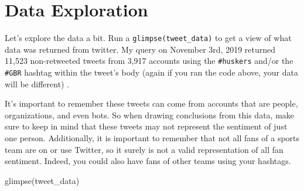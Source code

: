 \documentclass[
  letterpaper,
  DIV=11,
  numbers=noendperiod]{scrreprt}
\newenvironment{Shaded}{\begin{snugshade}}{\end{snugshade}}
\newcommand{\FunctionTok}[1]{\textcolor[rgb]{0.28,0.35,0.67}{#1}}
\newcommand{\NormalTok}[1]{\textcolor[rgb]{0.00,0.23,0.31}{#1}}
\begin{document}
\hypertarget{data-exploration}{%
\section{Data Exploration}\label{data-exploration}}

Let's explore the data a bit. Run a \texttt{glimpse(tweet\_data)} to get
a view of what data was returned from twitter. My query on November 3rd,
2019 returned 11,523 non-retweeted tweets from 3,917 accounts using the
\texttt{\#huskers} and/or the \texttt{\#GBR} hashtag within the tweet's
body (again if you ran the code above, your data will be different) .

It's important to remember these tweets can come from accounts that are
people, organizations, and even bots. So when drawing conclusions from
this data, make sure to keep in mind that these tweets may not represent
the sentiment of just one person. Additionally, it is important to
remember that not all fans of a sports team are on or use Twitter, so it
surely is not a valid representation of all fan sentiment. Indeed, you
could also have fans of other teams using your hashtags.

\begin{Shaded}
\begin{Highlighting}[]
\FunctionTok{glimpse}\NormalTok{(tweet\_data)}
\end{Highlighting}
\end{Shaded}
\end{document}
